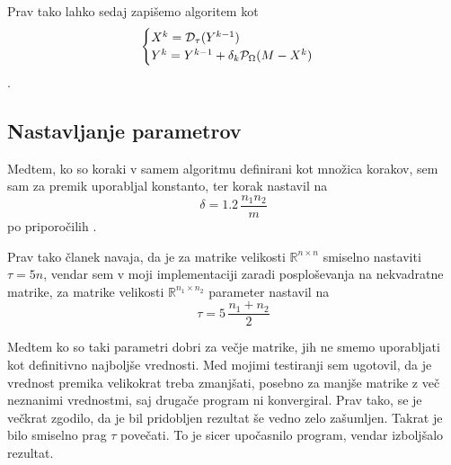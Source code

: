 Prav tako lahko sedaj zapišemo algoritem kot
\[
    \begin{cases}
        X^k = \mathcal{D}_\tau(Y^{k-1}) \\
        Y^k = Y^{k-1} + \delta_k \mathcal{P}_\Omega(M - X^k) 
    \end{cases}
\] \cite{CCS}.

\subsection{Nastavljanje parametrov}
Medtem, ko so koraki v samem algoritmu definirani kot množica korakov, 
sem sam za premik uporabljal konstanto, ter korak nastavil na 
\[
    \delta = 1.2\, \dfrac{n_1 n_2}{m}
\] po priporočilih \cite{CCS}. 

Prav tako članek navaja, da je za matrike velikosti $\mathbb{R}^{n \times n}$ smiselno nastaviti $\tau = 5n$, vendar sem v moji implementaciji zaradi posploševanja na nekvadratne matrike, za matrike velikosti $\mathbb{R}^{n_1 \times n_2}$ parameter nastavil na
\[
    \tau = 5\, \frac{n_1+n_2}{2}
\]

Medtem ko so taki parametri dobri za večje matrike, jih ne smemo uporabljati kot definitivno najboljše vrednosti. Med mojimi testiranji sem ugotovil, da je vrednost premika velikokrat treba zmanjšati, posebno za manjše matrike z več neznanimi vrednostmi, saj drugače program ni konvergiral. Prav tako, se je večkrat zgodilo, da je bil pridobljen rezultat še vedno zelo zašumljen. Takrat je bilo smiselno prag $\tau$ povečati. To je sicer upočasnilo program, vendar izboljšalo rezultat.